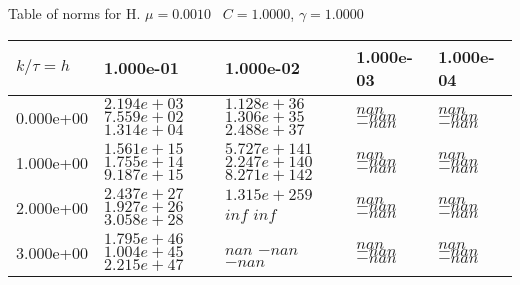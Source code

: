 \begin{center}
Table of norms for H. $\mu = 0.0010$ \, $C = 1.0000$, $\gamma = 1.0000$
  
\begin{tabular}{|p{1in}|p{1in}|p{1in}|p{1in}|p{1in}|} \hline
$k / \tau = h$ &1.000e-01 &1.000e-02 &1.000e-03 &1.000e-04 \\ \hline 
0.000e+00 & $2.194e+03$  $7.559e+02$  $1.314e+04$  & $1.128e+36$  $1.306e+35$  $2.488e+37$  & $nan$  $-nan$  $-nan$  & $nan$  $-nan$  $-nan$  \\ \hline 
1.000e+00 & $1.561e+15$  $1.755e+14$  $9.187e+15$  & $5.727e+141$  $2.247e+140$  $8.271e+142$  & $nan$  $-nan$  $-nan$  & $nan$  $-nan$  $-nan$  \\ \hline 
2.000e+00 & $2.437e+27$  $1.927e+26$  $3.058e+28$  & $1.315e+259$  $inf$  $inf$  & $nan$  $-nan$  $-nan$  & $nan$  $-nan$  $-nan$  \\ \hline 
3.000e+00 & $1.795e+46$  $1.004e+45$  $2.215e+47$  & $nan$  $-nan$  $-nan$  & $nan$  $-nan$  $-nan$  & $nan$  $-nan$  $-nan$  \\ \hline 

\end{tabular}\\[20pt]
\end{center}
